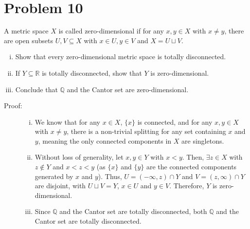 \documentclass[8pt]{extarticle}
\newcommand{\Q}{\mathbb{Q}}
\newcommand{\R}{\mathbb{R}}
\begin{document}
  \section{Problem 10}%
  A metric space $X$ is called zero-dimensional if for any $x,y\in X$ with $x\neq y$, there are open subsets $U,V\subseteq X$ with $x\in U,y\in V$ and $X = U\sqcup V$.
  \begin{enumerate}[(i)]
    \item Show that every zero-dimensional metric space is totally disconnected.
    \item If $Y\subseteq \R$ is totally disconnected, show that $Y$ is zero-dimensional.
    \item Conclude that $\Q$ and the Cantor set are zero-dimensional.
  \end{enumerate}
  \begin{description}
    \item[Proof:]\hfill
      \begin{enumerate}[(i)]
        \item We know that for any $x\in X$, $\{x\}$ is connected, and for any $x,y\in X$ with $x\neq y$, there is a non-trivial splitting for any set containing $x$ and $y$, meaning the only connected components in $X$ are singletons.
        \item Without loss of generality, let $x,y\in Y$ with $x < y$. Then, $\exists z\in X$ with $z\notin Y$ and $x < z < y$ (as $\{x\}$ and $\{y\}$ are the connected components generated by $x$ and $y$). Thus, $U = (-\infty,z)\cap Y$ and $V = (z,\infty)\cap Y$ are disjoint, with $U\sqcup V = Y$, $x\in U$ and $y\in V$. Therefore, $Y$ is zero-dimensional.
        \item Since $\Q$ and the Cantor set are totally disconnected, both $\Q$ and the Cantor set are totally disconnected.
      \end{enumerate}
  \end{description}
\end{document}
